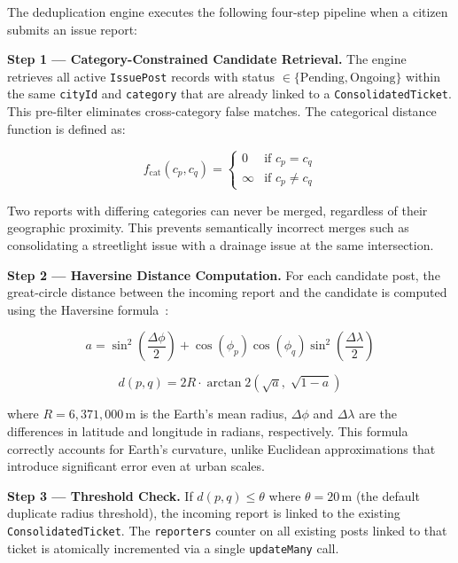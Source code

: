 \documentclass[conference]{IEEEtran}
\begin{document}
The deduplication engine executes the following four-step pipeline when a citizen submits an issue report:

\textbf{Step 1 --- Category-Constrained Candidate Retrieval.} The engine retrieves all active \texttt{IssuePost} records with status $\in \{\text{Pending}, \text{Ongoing}\}$ within the same \texttt{cityId} and \texttt{category} that are already linked to a \texttt{ConsolidatedTicket}. This pre-filter eliminates cross-category false matches. The categorical distance function is defined as:

\begin{equation}
f_{\text{cat}}(c_p, c_q) = 
\begin{cases}
0 & \text{if } c_p = c_q \\
\infty & \text{if } c_p \neq c_q
\end{cases}
\label{eq:catdist}
\end{equation}

Two reports with differing categories can never be merged, regardless of their geographic proximity. This prevents semantically incorrect merges such as consolidating a streetlight issue with a drainage issue at the same intersection.

\textbf{Step 2 --- Haversine Distance Computation.} For each candidate post, the great-circle distance between the incoming report and the candidate is computed using the Haversine formula~\cite{b9}:

\begin{equation}
a = \sin^2\!\left(\frac{\Delta\phi}{2}\right) + \cos(\phi_p)\cos(\phi_q)\sin^2\!\left(\frac{\Delta\lambda}{2}\right)
\label{eq:haversine_a}
\end{equation}

\begin{equation}
d(p, q) = 2R \cdot \arctan2\!\left(\sqrt{a},\; \sqrt{1-a}\right)
\label{eq:haversine}
\end{equation}

\noindent where $R = 6{,}371{,}000$\,m is the Earth's mean radius, $\Delta\phi$ and $\Delta\lambda$ are the differences in latitude and longitude in radians, respectively. This formula correctly accounts for Earth's curvature, unlike Euclidean approximations that introduce significant error even at urban scales.

\textbf{Step 3 --- Threshold Check.} If $d(p, q) \leq \theta$ where $\theta = 20$\,m (the default duplicate radius threshold), the incoming report is linked to the existing \texttt{ConsolidatedTicket}. The \texttt{reporters} counter on all existing posts linked to that ticket is atomically incremented via a single \texttt{updateMany} call.
\end{document}
